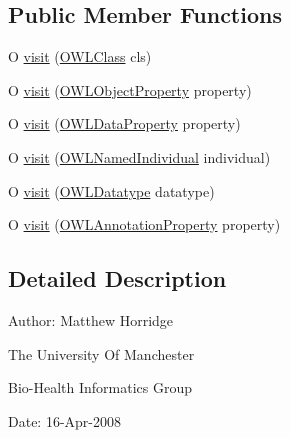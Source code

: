 \subsection*{Public Member Functions}
\begin{DoxyCompactItemize}
\item 
O \hyperlink{interfaceorg_1_1semanticweb_1_1owlapi_1_1model_1_1_o_w_l_entity_visitor_ex_3_01_o_01_4_a1a6d632eb8961bcaaf284b7320af3bfa}{visit} (\hyperlink{interfaceorg_1_1semanticweb_1_1owlapi_1_1model_1_1_o_w_l_class}{O\-W\-L\-Class} cls)
\item 
O \hyperlink{interfaceorg_1_1semanticweb_1_1owlapi_1_1model_1_1_o_w_l_entity_visitor_ex_3_01_o_01_4_a894f164b18a7380a02c507d1b681d110}{visit} (\hyperlink{interfaceorg_1_1semanticweb_1_1owlapi_1_1model_1_1_o_w_l_object_property}{O\-W\-L\-Object\-Property} property)
\item 
O \hyperlink{interfaceorg_1_1semanticweb_1_1owlapi_1_1model_1_1_o_w_l_entity_visitor_ex_3_01_o_01_4_a50d04a6c44baca598abb9d19e4e157d1}{visit} (\hyperlink{interfaceorg_1_1semanticweb_1_1owlapi_1_1model_1_1_o_w_l_data_property}{O\-W\-L\-Data\-Property} property)
\item 
O \hyperlink{interfaceorg_1_1semanticweb_1_1owlapi_1_1model_1_1_o_w_l_entity_visitor_ex_3_01_o_01_4_aafd37a0503d2d751d19a5a58d2581482}{visit} (\hyperlink{interfaceorg_1_1semanticweb_1_1owlapi_1_1model_1_1_o_w_l_named_individual}{O\-W\-L\-Named\-Individual} individual)
\item 
O \hyperlink{interfaceorg_1_1semanticweb_1_1owlapi_1_1model_1_1_o_w_l_entity_visitor_ex_3_01_o_01_4_ad44be3a4579d33c039e793fd681e4f52}{visit} (\hyperlink{interfaceorg_1_1semanticweb_1_1owlapi_1_1model_1_1_o_w_l_datatype}{O\-W\-L\-Datatype} datatype)
\item 
O \hyperlink{interfaceorg_1_1semanticweb_1_1owlapi_1_1model_1_1_o_w_l_entity_visitor_ex_3_01_o_01_4_ab2489c8a1d467d222b60139880a48c77}{visit} (\hyperlink{interfaceorg_1_1semanticweb_1_1owlapi_1_1model_1_1_o_w_l_annotation_property}{O\-W\-L\-Annotation\-Property} property)
\end{DoxyCompactItemize}


\subsection{Detailed Description}
Author\-: Matthew Horridge\par
 The University Of Manchester\par
 Bio-\/\-Health Informatics Group\par
 Date\-: 16-\/\-Apr-\/2008\par
\par
 

